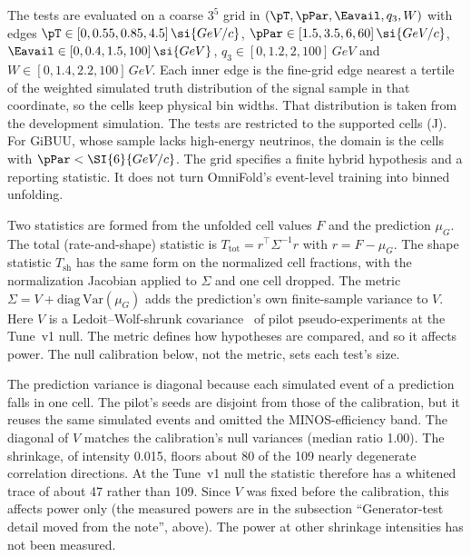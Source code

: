 The tests are evaluated on a coarse $3^{5}$ grid in $(\pT,\pPar,\Eavail,q_{3},W)$ with edges $\pT\in[0,0.55,0.85,4.5]\,\si{GeV/c}$, $\pPar\in[1.5,3.5,6,60]\,\si{GeV/c}$, $\Eavail\in[0,0.4,1.5,100]\,\si{GeV}$, $q_{3}\in[0,1.2,2,100]\,\si{GeV}$ and $W\in[0,1.4,2.2,100]\,\si{GeV}$. Each inner edge is the fine-grid edge nearest a tertile of the weighted simulated truth distribution of the signal sample in that coordinate, so the cells keep physical bin widths. That distribution is taken from the development simulation. The tests are restricted to the \jtNcells{} supported cells (J). For GiBUU, whose sample lacks high-energy neutrinos, the domain is the \jtNcellsGiBUU{} cells with $\pPar<\SI{6}{GeV/c}$. The grid specifies a finite hybrid hypothesis and a reporting statistic. It does not turn OmniFold's event-level training into binned unfolding.

Two statistics are formed from the unfolded cell values $F$ and the prediction $\mu_{G}$. The total (rate-and-shape) statistic is $T_{\mathrm{tot}}=r^{\top}\Sigma^{-1}r$ with $r=F-\mu_{G}$. The shape statistic $T_{\mathrm{sh}}$ has the same form on the normalized cell fractions, with the normalization Jacobian applied to $\Sigma$ and one cell dropped. The metric $\Sigma=V+\mathrm{diag}\,\mathrm{Var}(\mu_{G})$ adds the prediction's own finite-sample variance to $V$. Here $V$ is a Ledoit--Wolf-shrunk covariance~\cite{LedoitWolf:2004} of \jtVn{} pilot pseudo-experiments at the Tune~v1 null. The metric defines how hypotheses are compared, and so it affects power. The null calibration below, not the metric, sets each test's size.

The prediction variance is diagonal because each simulated event of a prediction falls in one cell. The pilot's seeds are disjoint from those of the calibration, but it reuses the same simulated events and omitted the MINOS-efficiency band. The diagonal of $V$ matches the calibration's null variances (median ratio 1.00). The shrinkage, of intensity 0.015, floors about 80 of the 109 nearly degenerate correlation directions. At the Tune~v1 null the statistic therefore has a whitened trace of about 47 rather than 109. Since $V$ was fixed before the calibration, this affects power only (the measured powers are in the subsection ``Generator-test detail moved from the note'', above). The power at other shrinkage intensities has not been measured.

